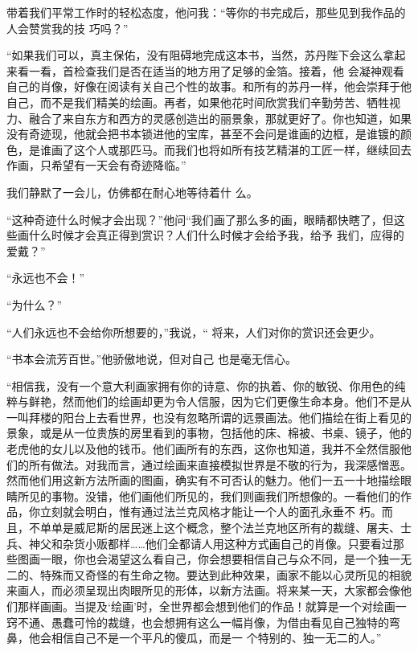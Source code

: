 \documentclass{article}
\begin{document}
带着我们平常工作时的轻松态度，他问我：“等你的书完成后，那些见到我作品的人会赞赏我的技
巧吗？” 

“如果我们可以，真主保佑，没有阻碍地完成这本书，当然，苏丹陛下会这么拿起来看一看，首检查我们是否在适当的地方用了足够的金箔。接着，他
\newpage
会凝神观看自己的肖像，好像在阅读有关自己个性的故事。和所有的苏丹一样，他会崇拜于他自己，而不是我们精美的绘画。再者，如果他花时间欣赏我们辛勤劳苦、牺牲视力、融合了来自东方和西方的灵感创造出的丽景象，那就更好了。你也知道，如果没有奇迹现，他就会把书本锁进他的宝库，甚至不会问是谁画的边框，是谁镀的颜色，是谁画了这个人或那匹马。而我们也将如所有技艺精湛的工匠一样，继续回去
作画，只希望有一天会有奇迹降临。” 

我们静默了一会儿，仿佛都在耐心地等待着什
么。 

“这种奇迹什么时候才会出现？”他问“我们画了那么多的画，眼睛都快瞎了，但这些画什么时候才会真正得到赏识？人们什么时候才会给予我，给予
我们，应得的爱戴？” 


“永远也不会！” 


\newpage

“为什么？” 

“人们永远也不会给你所想要的，”我说，“
将来，人们对你的赏识还会更少。 

“书本会流芳百世。”他骄傲地说，但对自己
也是毫无信心。 

“相信我，没有一个意大利画家拥有你的诗意、你的执着、你的敏锐、你用色的纯粹与鲜艳，然而他们的绘画却更为令人信服，因为它们更像生命本身。他们不是从一叫拜楼的阳台上去看世界，也没有忽略所谓的远景画法。他们描绘在街上看见的景象，或是从一位贵族的房里看到的事物，包括他的床、棉被、书桌、镜子，他的老虎他的女儿以及他的钱币。他们画所有的东西，这你也知道，我并不全然信服他们的所有做法。对我而言，通过绘画来直接模拟世界是不敬的行为，我深感憎恶。然而他们用这新方法所画的图画，确实有不可否认的魅力。他们一五一十地描绘眼睛所见的事物。没错，他们画他们所见的，我们则画我们所想像的。一看他们的作品，你立刻就会明白，惟有通过法兰克风格才能让一个人的面孔永垂不
\newpage
朽。而且，不单单是威尼斯的居民迷上这个概念，整个法兰克地区所有的裁缝、屠夫、士兵、神父和杂货小贩都样……他们全都请人用这种方式画自己的肖像。只要看过那些图画一眼，你也会渴望这么看自己，你会想要相信自己与众不同，是一个独一无二的、特殊而又奇怪的有生命之物。要达到此种效果，画家不能以心灵所见的相貌来画人，而必须呈现出肉眼所见的形体，以新方法画。将来某一天，大家都会像他们那样画画。当提及‘绘画’时，全世界都会想到他们的作品！就算是一个对绘画一窍不通、愚蠢可怜的裁缝，也会想拥有这么一幅肖像，为借由看见自己独特的弯鼻，他会相信自己不是一个平凡的傻瓜，而是一
个特别的、独一无二的人。” 
\end{document}
